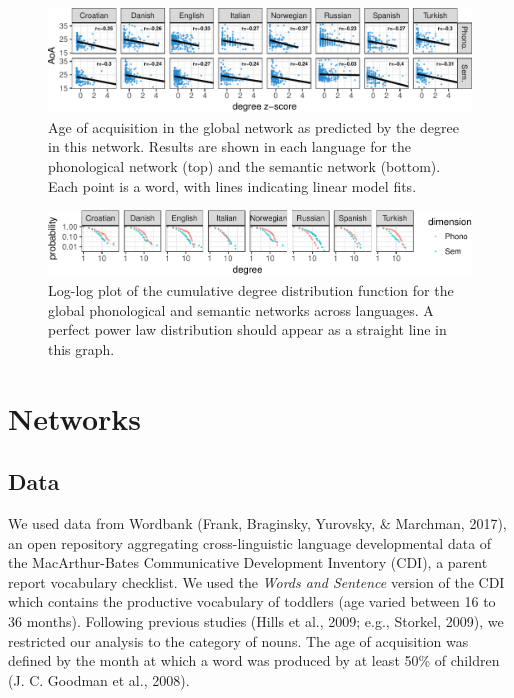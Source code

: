 \documentclass[10pt, letterpaper]{article}
\newenvironment{CodeChunk}{}{}
\begin{document}
\begin{CodeChunk}
\begin{figure}[h]

{\centering \includegraphics{figs/all_data-1} 

}

\caption{\label{fig:data_all}Age of acquisition in the global network as predicted by the degree in this network. Results are shown in each language for the phonological network (top) and the semantic network (bottom). Each point is a word, with lines indicating linear model fits.}\label{fig:all_data}
\end{figure}
\end{CodeChunk}

\begin{CodeChunk}
\begin{figure}[h]

{\centering \includegraphics{figs/degree_distribution-1} 

}

\caption{\label{fig:degree_distribution}Log-log plot of the cumulative degree distribution function for the global phonological and semantic networks across languages. A perfect power law distribution should appear as a straight line in this graph.}\label{fig:degree_distribution}
\end{figure}
\end{CodeChunk}

\section{Networks}\label{networks}

\subsection{Data}\label{data}

We used data from Wordbank (Frank, Braginsky, Yurovsky, \& Marchman,
2017), an open repository aggregating cross-linguistic language
developmental data of the MacArthur-Bates Communicative Development
Inventory (CDI), a parent report vocabulary checklist. We used the
\emph{Words and Sentence} version of the CDI which contains the
productive vocabulary of toddlers (age varied between 16 to 36 months).
Following previous studies (Hills et al., 2009; e.g., Storkel, 2009), we
restricted our analysis to the category of nouns. The age of acquisition
was defined by the month at which a word was produced by at least 50\%
of children (J. C. Goodman et al., 2008).
\end{document}
